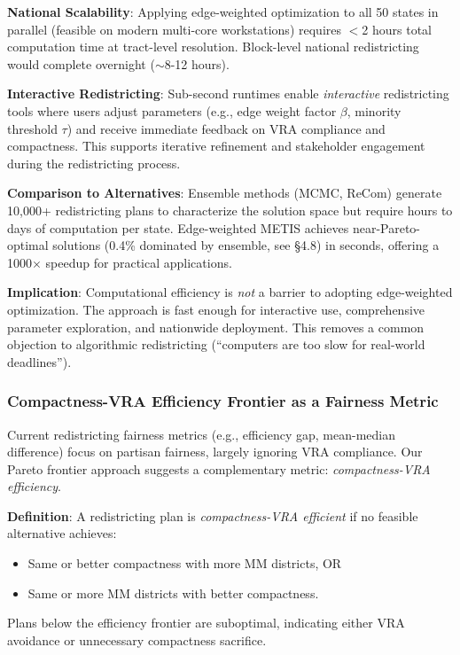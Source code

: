 \textbf{National Scalability}: Applying edge-weighted optimization to all 50 states in parallel (feasible on modern multi-core workstations) requires $<$2 hours total computation time at tract-level resolution. Block-level national redistricting would complete overnight ($\sim$8-12 hours).

\textbf{Interactive Redistricting}: Sub-second runtimes enable \emph{interactive} redistricting tools where users adjust parameters (e.g., edge weight factor $\beta$, minority threshold $\tau$) and receive immediate feedback on VRA compliance and compactness. This supports iterative refinement and stakeholder engagement during the redistricting process.

\textbf{Comparison to Alternatives}: Ensemble methods (MCMC, ReCom) generate 10,000+ redistricting plans to characterize the solution space but require hours to days of computation per state. Edge-weighted METIS achieves near-Pareto-optimal solutions (0.4\% dominated by ensemble, see §4.8) in seconds, offering a 1000$\times$ speedup for practical applications.

\textbf{Implication}: Computational efficiency is \emph{not} a barrier to adopting edge-weighted optimization. The approach is fast enough for interactive use, comprehensive parameter exploration, and nationwide deployment. This removes a common objection to algorithmic redistricting (``computers are too slow for real-world deadlines'').

\subsubsection{Compactness-VRA Efficiency Frontier as a Fairness Metric}

Current redistricting fairness metrics (e.g., efficiency gap, mean-median difference) focus on partisan fairness, largely ignoring VRA compliance. Our Pareto frontier approach suggests a complementary metric: \emph{compactness-VRA efficiency}.

\textbf{Definition}: A redistricting plan is \emph{compactness-VRA efficient} if no feasible alternative achieves:
\begin{itemize}
    \item Same or better compactness with more MM districts, OR
    \item Same or more MM districts with better compactness.
\end{itemize}

Plans below the efficiency frontier are suboptimal, indicating either VRA avoidance or unnecessary compactness sacrifice.

